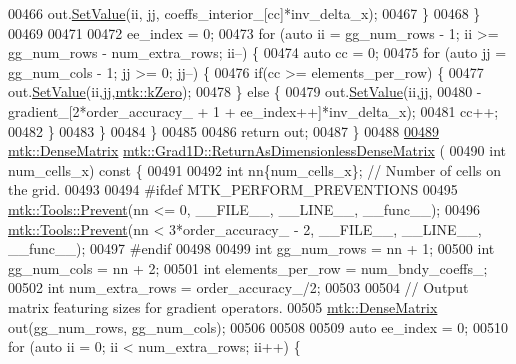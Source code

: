 \begin{DoxyCode}
{{00466       out.\hyperlink{classmtk_1_1DenseMatrix_a784ce5784109ac86bfb9d8562b334b13}{SetValue}(ii, jj, coeffs\_interior\_[cc]*inv\_delta\_x);
00467     \}
00468   \}
00469 
00471 
00472   ee\_index = 0;
00473   \textcolor{keywordflow}{for} (\textcolor{keyword}{auto} ii = gg\_num\_rows - 1; ii >= gg\_num\_rows - num\_extra\_rows; ii--) \{
00474     \textcolor{keyword}{auto} cc = 0;
00475     \textcolor{keywordflow}{for} (\textcolor{keyword}{auto} jj = gg\_num\_cols - 1; jj >= 0; jj--) \{
00476       \textcolor{keywordflow}{if}(cc >= elements\_per\_row) \{
00477         out.\hyperlink{classmtk_1_1DenseMatrix_a784ce5784109ac86bfb9d8562b334b13}{SetValue}(ii,jj,\hyperlink{group__c01-roots_ga59a451a5fae30d59649bcda274fea271}{mtk::kZero});
00478       \} \textcolor{keywordflow}{else} \{
00479         out.\hyperlink{classmtk_1_1DenseMatrix_a784ce5784109ac86bfb9d8562b334b13}{SetValue}(ii,jj,
00480                     -gradient\_[2*order\_accuracy\_ + 1 + ee\_index++]*inv\_delta\_x);
00481         cc++;
00482       \}
00483      \}
00484   \}
00485 
00486   \textcolor{keywordflow}{return} out;
00487 \}
00488 
\hypertarget{mtk__grad__1d_8cc_source_l00489}{}\hyperlink{classmtk_1_1Grad1D_ab07e6a15edca32534ae3d1a8ccaf1c42}{00489} \hyperlink{classmtk_1_1DenseMatrix}{mtk::DenseMatrix} \hyperlink{classmtk_1_1Grad1D_ab07e6a15edca32534ae3d1a8ccaf1c42}{mtk::Grad1D::ReturnAsDimensionlessDenseMatrix}
      (
00490   \textcolor{keywordtype}{int} num\_cells\_x)\textcolor{keyword}{ const }\{
00491 
00492   \textcolor{keywordtype}{int} nn\{num\_cells\_x\}; \textcolor{comment}{// Number of cells on the grid.}
00493 
00494 \textcolor{preprocessor}{  #ifdef MTK\_PERFORM\_PREVENTIONS}
00495   \hyperlink{classmtk_1_1Tools_a332324c6f25e66be9dff48c5987a3b9f}{mtk::Tools::Prevent}(nn <= 0, \_\_FILE\_\_, \_\_LINE\_\_, \_\_func\_\_);
00496   \hyperlink{classmtk_1_1Tools_a332324c6f25e66be9dff48c5987a3b9f}{mtk::Tools::Prevent}(nn < 3*order\_accuracy\_ - 2, \_\_FILE\_\_, \_\_LINE\_\_, \_\_func\_\_);
00497 \textcolor{preprocessor}{  #endif}
00498 
00499   \textcolor{keywordtype}{int} gg\_num\_rows = nn + 1;
00500   \textcolor{keywordtype}{int} gg\_num\_cols = nn + 2;
00501   \textcolor{keywordtype}{int} elements\_per\_row = num\_bndy\_coeffs\_;
00502   \textcolor{keywordtype}{int} num\_extra\_rows = order\_accuracy\_/2;
00503 
00504   \textcolor{comment}{// Output matrix featuring sizes for gradient operators.}
00505   \hyperlink{classmtk_1_1DenseMatrix}{mtk::DenseMatrix} out(gg\_num\_rows, gg\_num\_cols);
00506 
00508 
00509   \textcolor{keyword}{auto} ee\_index = 0;
00510   \textcolor{keywordflow}{for} (\textcolor{keyword}{auto} ii = 0; ii < num\_extra\_rows; ii++) \{
}}
\end{DoxyCode}
